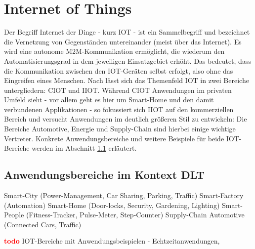 %
%
\section{Internet of Things}
\label{sec:fundamentals:iot}
Der Begriff Internet der Dinge - kurz \ac{IOT} - ist ein Sammelbegriff und bezeichnet die Vernetzung von Gegenständen untereinander (meist über das Internet). Es wird eine autonome \ac{M2M}-Kommunikation ermöglicht, die wiederum den Automatisierungsgrad in dem jeweiligen Einsatzgebiet erhöht. Das bedeutet, dass die Kommunikation zwischen den \ac{IOT}-Geräten selbst erfolgt, also ohne das Eingreifen eines Menschen. Nach \cite{deloitte2018} lässt sich das Themenfeld \ac{IOT} in zwei Bereiche untergliedern: \ac{CIOT} und \ac{IIOT}. Während \ac{CIOT} Anwendungen im privaten Umfeld sieht - vor allem geht es hier um Smart-Home und den damit verbundenen Applikationen - so fokussiert sich \ac{IIOT} auf den kommerziellen Bereich und versucht Anwendungen im deutlich größeren Stil zu entwickeln: Die Bereiche Automotive, Energie und Supply-Chain sind hierbei einige wichtige Vertreter. Konkrete Anwendungsbereiche und weitere Beispiele für beide \ac{IOT}-Bereiche werden im Abschnitt \ref{subsec:fundamentals:iot:usecases} erläutert.\\


\subsection{Anwendungsbereiche im Kontext DLT}
\label{subsec:fundamentals:iot:usecases}
Smart-City (Power-Management, Car Sharing, Parking, Traffic)
Smart-Factory (Automation)
Smart-Home (Door-locks, Security, Gardening, Lighting)
Smart-People (Fitness-Tracker, Pulse-Meter, Step-Counter)
Supply-Chain
Automotive (Connected Cars, Traffic)

\textbf{\textcolor{red}{todo}}
IOT-Bereiche mit Anwendungsbeispielen - Echtzeitanwendungen,


